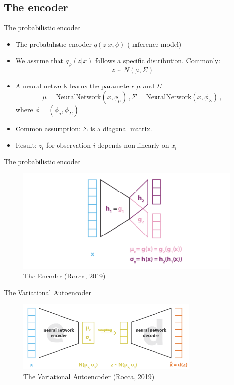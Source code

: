 \documentclass[10pt]{beamer}
\begin{document}
\subsection{The encoder}

\begin{frame}{The probabilistic encoder}

\begin{itemize}
\item The probabilistic encoder $q(z|x, \phi)$ ({\color{uured} inference model})
\pause
\item We assume that $q_\phi(z|x)$ follows a specific distribution. Commonly:
\[
z \sim N(\mu, \Sigma)
\]
\item A neural network learns the parameters $\mu$ and $\Sigma$
\[
\mu = \text{NeuralNetwork}(x,\phi_\mu)\,, \Sigma = \text{NeuralNetwork}(x,\phi_\Sigma)\,,
\]
where $\phi = (\phi_\mu, \phi_\Sigma)$
\pause
\item Common assumption: $\Sigma$ is a diagonal matrix.
\pause
\item {\color{uured} Result}: $z_i$ for observation $i$ depends non-linearly on $x_i$
\end{itemize}

\end{frame}

\begin{frame}{The probabilistic encoder}

\begin{figure}[h]
\centering
\includegraphics[width=1\textwidth]{fig/Rocca_VAE_encoder.png}
\caption{The Encoder (Rocca, 2019)}
\end{figure}

\end{frame}



\begin{frame}{The Variational Autoencoder}

\begin{figure}[h]
\centering
\includegraphics[width=0.8\textwidth]{fig/Rocca_VAE2.png}
\caption{The Variational Autoencoder (Rocca, 2019)}
\end{figure}

\end{frame}
\end{document}
